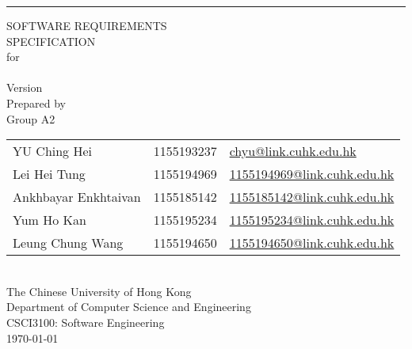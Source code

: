\documentclass[a4paper, 11pt]{scrreprt}
\begin{document}

\begin{titlepage}
    \begin{flushright}
        \rule{\textwidth}{5pt}\vskip1cm
        \begin{bfseries}
            \Huge{SOFTWARE REQUIREMENTS\\ SPECIFICATION}\\
            \vspace{1.6cm}
            for\\
            \vspace{1.6cm}
            \projectname\\  %
            \vspace{1.6cm}
            \LARGE{Version \myversion}\\
            \vspace{1.6cm}
            Prepared by\\
            Group A2\\
            \Large{
                \begin{tabularx}{\textwidth}{l l >{\raggedleft\arraybackslash}X}
                    YU Ching Hei & 1155193237 & \href{mailto:chyu@link.cuhk.edu.hk}{chyu@link.cuhk.edu.hk}\\
                    Lei Hei Tung & 1155194969 & \href{mailto:1155194969@link.cuhk.edu.hk}{1155194969@link.cuhk.edu.hk}\\
                    Ankhbayar Enkhtaivan & 1155185142 & \href{mailto:1155185142@link.cuhk.edu.hk}{1155185142@link.cuhk.edu.hk}\\
                    Yum Ho Kan & 1155195234 & \href{mailto:1155195234@link.cuhk.edu.hk}{1155195234@link.cuhk.edu.hk}\\
                    Leung Chung Wang & 1155194650 & \href{mailto:1155194650@link.cuhk.edu.hk}{1155194650@link.cuhk.edu.hk}\\
                \end{tabularx}
            }\\
            \vspace{1.6cm}
            The Chinese University of Hong Kong\\
            Department of Computer Science and Engineering\\
            CSCI3100: Software Engineering\\
            \vspace{1.6cm}
            \today\\
        \end{bfseries}
    \end{flushright}
\end{titlepage}
\end{document}
